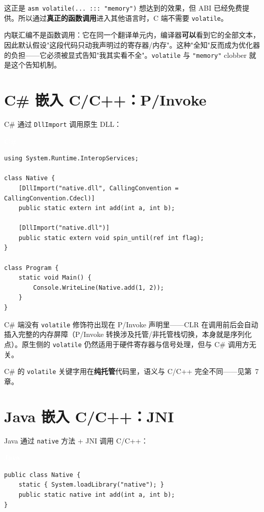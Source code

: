 \documentclass[12pt,a4paper,fontset=fandol]{ctexbook}
\newcommand{\csharplabel}{%
  \begin{tcolorbox}[enhanced,colback=csharpheadbg,colframe=csharpheadbg,
    arc=1mm,boxrule=0mm,left=6pt,right=6pt,top=2pt,bottom=2pt,
    halign=left,oversize]
    \textcolor{white}{\small\bfseries C\#}
  \end{tcolorbox}\vspace{-4pt}}
\newcommand{\javalabel}{%
  \begin{tcolorbox}[enhanced,colback=javaheadbg,colframe=javaheadbg,
    arc=1mm,boxrule=0mm,left=6pt,right=6pt,top=2pt,bottom=2pt,
    halign=left,oversize]
    \textcolor{white}{\small\bfseries Java}
  \end{tcolorbox}\vspace{-4pt}}
\newcommand{\cpp}[1]{C++#1}
\newcommand{\kw}[1]{\texttt{#1}}
\begin{document}
这正是 \texttt{asm volatile(... ::: "memory")} 想达到的效果，但 ABI 已经免费提供。所以通过\textbf{真正的函数调用}进入其他语言时，C 端不需要 \kw{volatile}。

\begin{tcolorbox}[guideline={内联汇编为何特殊}]
内联汇编不是函数调用：它在同一个翻译单元内，编译器\textbf{可以}看到它的全部文本，因此默认假设"这段代码只动我声明过的寄存器/内存"。这种"全知"反而成为优化器的负担——它必须被显式告知"我其实看不全"。\kw{volatile} 与 \texttt{"memory"} clobber 就是这个告知机制。
\end{tcolorbox}

\section{C\# 嵌入 C/C++：P/Invoke}\label{sec:csharp-pinvoke}

C\# 通过 \texttt{DllImport} 调用原生 DLL：

\csharplabel
\begin{lstlisting}[style=csharpstyle]
using System.Runtime.InteropServices;

class Native {
    [DllImport("native.dll", CallingConvention = CallingConvention.Cdecl)]
    public static extern int add(int a, int b);

    [DllImport("native.dll")]
    public static extern void spin_until(ref int flag);
}

class Program {
    static void Main() {
        Console.WriteLine(Native.add(1, 2));
    }
}
\end{lstlisting}

C\# 端没有 \kw{volatile} 修饰符出现在 P/Invoke 声明里——CLR 在调用前后会自动插入完整的内存屏障（P/Invoke 转换涉及托管/非托管栈切换，本身就是序列化点）。原生侧的 \kw{volatile} 仍然适用于硬件寄存器与信号处理，但与 C\# 调用方无关。

C\# 的 \kw{volatile} 关键字用在\textbf{纯托管}代码里，语义与 C/\allowbreak{}\cpp{} 完全不同——见第~7 章。

\section{Java 嵌入 C/C++：JNI}\label{sec:java-jni}

Java 通过 \texttt{native} 方法 + JNI 调用 C/\allowbreak{}\cpp{}：

\javalabel
\begin{lstlisting}[style=javastyle]
public class Native {
    static { System.loadLibrary("native"); }
    public static native int add(int a, int b);
}
\end{lstlisting}
\end{document}

